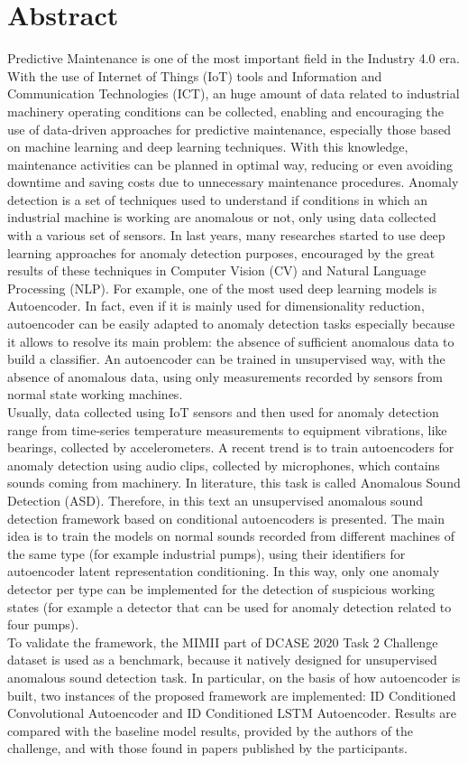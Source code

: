 \chapter{Abstract} 

Predictive Maintenance is one of the most important field in the Industry 4.0 era. With the use of Internet of Things (IoT) tools and Information and Communication Technologies (ICT), an huge amount of data related to industrial machinery operating conditions can be collected, enabling and encouraging the use of data-driven approaches for predictive maintenance, especially those based on machine learning and deep learning techniques. With this knowledge, maintenance activities can be planned in optimal way, reducing or even avoiding downtime and saving costs due to unnecessary maintenance procedures.
Anomaly detection is a set of techniques used to understand if conditions in which an industrial machine is working are anomalous or not, only using data collected with a various set of sensors. In last years, many researches started to use deep learning approaches for anomaly detection purposes, encouraged by the great results of these techniques in Computer Vision (CV) and Natural Language Processing (NLP). For example, one of the most used deep learning models is Autoencoder. In fact, even if it is mainly used for dimensionality reduction, autoencoder can be easily adapted to anomaly detection tasks especially because it allows to resolve its main problem: the absence of sufficient anomalous data to build a classifier. An autoencoder can be trained in unsupervised way, with the absence of anomalous data, using only measurements recorded by sensors from normal state working machines.\\ Usually, data collected using IoT sensors and then used for anomaly detection range from time-series temperature measurements to equipment vibrations, like bearings, collected by accelerometers. A recent trend is to train autoencoders for anomaly detection using audio clips, collected by microphones, which contains sounds coming from machinery. In literature, this task is called Anomalous Sound Detection (ASD). Therefore, in this text an unsupervised anomalous sound detection framework based on conditional autoencoders is presented. The main idea is to train the models on normal sounds recorded from different machines of the same type (for example industrial pumps), using their identifiers for autoencoder latent representation conditioning. In this way, only one anomaly detector per type can be implemented for the detection of suspicious working states (for example a detector that can be used for anomaly detection related to four pumps).\\
To validate the framework, the MIMII part of DCASE 2020 Task 2 Challenge dataset is used as a benchmark, because it natively designed for unsupervised anomalous sound detection task. In particular, on the basis of how autoencoder is built, two instances of the proposed framework are implemented: ID Conditioned Convolutional Autoencoder and ID Conditioned LSTM Autoencoder. Results are compared with the baseline model results, provided by the authors of the challenge, and with those found in papers published by the participants.